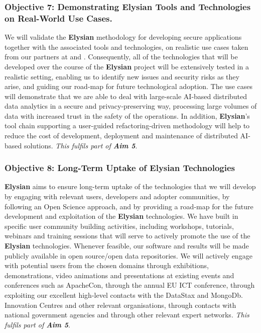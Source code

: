 \documentclass[a4paper,11pt]{article}
\newcommand{\project}[1]{\textbf{#1}\xspace}
\newcommand{\SECURITY}{\project{Elysian}}
\newcommand{\TheProject}{\SECURITY}
\begin{document}
\subsubsection*{Objective 7: Demonstrating \TheProject{} Tools and Technologies on Real-World Use Cases.}
\vspace{-6pt}
We will validate the \TheProject{} methodology for developing secure applications together with the associated tools and technologies, on realistic use cases taken from our partners at \SOPRAshort{} and \FRQshort{}.
Consequently, all of the technologies that will be developed over the course of the \TheProject{} project will be extensively tested in a realistic setting, enabling us to identify new issues and security risks as they arise, and guiding our road-map for future technological adoption. The use cases will demonstrate that we are able to deal with large-scale AI-based distributed data analytics in a secure and privacy-preserving way, processing large volumes of data with increased trust in the safety of the operations. In addition, \TheProject{}'s tool chain supporting
a user-guided refactoring-driven methodology %
will help to reduce the cost of development, deployment and maintenance of distributed AI-based solutions. 
\emph{This fulfils part of \textbf{Aim 5}}.

\pagebreak
\subsubsection*{Objective 8: Long-Term Uptake of \TheProject{} Technologies} 
\vspace{-7pt}
\TheProject{} aims to ensure long-term uptake of the technologies that we will develop by engaging with relevant users, developers and adopter communities, by following an Open Science approach, and by providing a road-map for the future development and exploitation of the \TheProject{} technologies. We have built in specific user community building activities, including  workshops, tutorials, webinars and training sessions that will serve to actively promote the use of the \TheProject{} technologies. Whenever feasible, our software and results will be made publicly available in open source/open data repositories. We will actively engage with potential users from the chosen domains through exhibitions, demonstrations, video animations and presentations at existing events and conferences such as ApacheCon, through the annual EU ICT conference, through exploiting our excellent high-level contacts with the DataStax and MongoDb. Innovation Centres and other relevant organisations, through contacts with national government agencies and through other relevant expert networks.
\emph{This fulfils part of \textbf{Aim 5}}.
\end{document}
